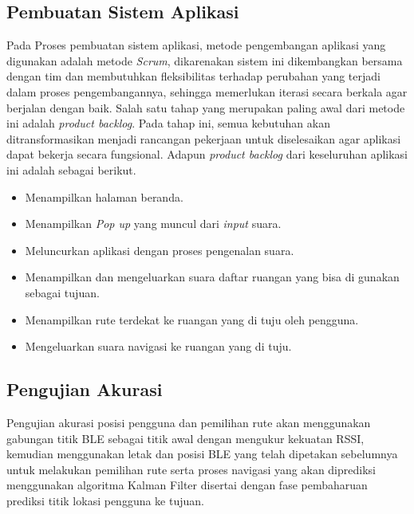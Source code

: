 \newpage
\subsection{Pembuatan Sistem Aplikasi}
Pada Proses pembuatan sistem aplikasi, metode pengembangan aplikasi yang digunakan adalah metode \textit{Scrum}, dikarenakan sistem ini dikembangkan bersama dengan tim dan membutuhkan fleksibilitas terhadap perubahan yang terjadi dalam proses pengembangannya, sehingga memerlukan iterasi secara berkala agar berjalan dengan baik. Salah satu tahap yang merupakan paling awal dari metode ini adalah \textit{product backlog}. Pada tahap ini, semua kebutuhan akan ditransformasikan menjadi rancangan pekerjaan untuk diselesaikan agar aplikasi dapat bekerja secara fungsional. Adapun \textit{product backlog} dari keseluruhan aplikasi ini adalah sebagai berikut.

\begin{itemize}
\item Menampilkan halaman beranda.

\item Menampilkan \textit{Pop up} yang muncul dari \textit{input} suara.

\item Meluncurkan aplikasi dengan proses pengenalan suara.

\item Menampilkan dan mengeluarkan suara daftar ruangan yang bisa di gunakan sebagai tujuan.

\item Menampilkan rute terdekat ke ruangan yang di tuju oleh pengguna.

\item Mengeluarkan suara navigasi ke ruangan yang di tuju.

\end{itemize}

\subsection{Pengujian Akurasi}
Pengujian akurasi posisi pengguna dan pemilihan rute akan menggunakan gabungan titik BLE sebagai titik awal dengan mengukur kekuatan RSSI, kemudian menggunakan letak dan posisi BLE yang telah dipetakan sebelumnya untuk melakukan pemilihan rute serta proses navigasi yang akan diprediksi menggunakan algoritma Kalman Filter disertai dengan fase pembaharuan prediksi titik lokasi pengguna ke tujuan.


